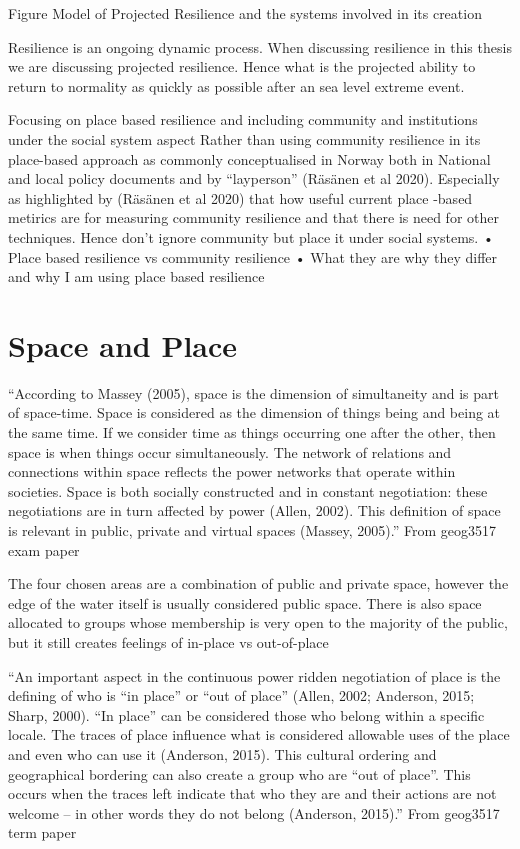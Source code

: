 \documentclass{article}
\begin{document}
\begin{frame}{Figure Model of Projected Resilience and the systems involved in its creation }
\end{frame}


    



Resilience is an ongoing dynamic process. When discussing resilience in this thesis we are discussing projected resilience. Hence what is the projected ability to return to normality as quickly as possible after an sea level extreme event. 
 
Focusing on place based resilience and including community and institutions under the social system aspect
Rather than using community resilience in its place-based approach as commonly conceptualised in Norway both in National and local policy documents and by “layperson” (Räsänen et al 2020). Especially as highlighted by (Räsänen et al 2020) that how useful current place -based metirics are for measuring community resilience and that there is need for other techniques. Hence don’t ignore community but place it under social systems. 
•	Place based resilience vs community resilience
•	What they are why they differ and why I am using place based resilience

\section{Space and Place} 
“According to Massey (2005), space is the dimension of simultaneity and is part of space-time.
Space is considered as the dimension of things being and being at the same time. If we
consider time as things occurring one after the other, then space is when things occur
simultaneously. The network of relations and connections within space reflects the power
networks that operate within societies. Space is both socially constructed and in constant
negotiation: these negotiations are in turn affected by power (Allen, 2002). This definition of
space is relevant in public, private and virtual spaces (Massey, 2005).” From geog3517 exam paper

The four chosen areas are a combination of public and private space, however the edge of the water itself is usually considered public space. There is also space allocated to groups whose membership is very open to the majority of the public, but it still creates feelings of in-place vs out-of-place


“An important aspect in the continuous power ridden negotiation of place is the defining of who is “in place” or “out of place” (Allen, 2002; Anderson, 2015; Sharp, 2000). “In place” can be considered
those who belong within a specific locale. The traces of place influence what is considered
allowable uses of the place and even who can use it (Anderson, 2015). This cultural ordering
and geographical bordering can also create a group who are “out of place”. This occurs when
the traces left indicate that who they are and their actions are not welcome – in other words
they do not belong (Anderson, 2015).” From geog3517 term paper
\end{document}
